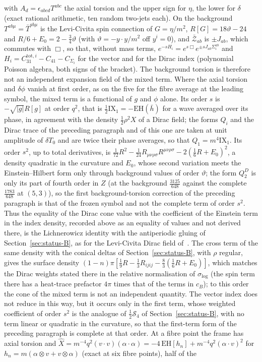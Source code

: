 with \(A_d=\epsilon_{abcd}T^{abc}\) the axial torsion and the upper sign for \(\eta\), the lower for \(\delta\) (exact rational arithmetic, ten random two-jets each). On the background \(T^{ab\mu}=\bar T^{ab\mu}\) is the Levi-Civita spin connection of \(G=\eta/m^2\), \(R[G]=18\vartheta-24\) and \(R/6+E_0=2-\tfrac34\vartheta\) (with \(\vartheta=-y\cdot y/m^2\) off \(y^i=0\)), and \(\bar{\mathcal Z}_{ab}\) is \(\pm J_{ab}\), which commutes with \(\Box\), so that, without mass terms, \(e^{-sH_i}=e^{s\Box}e^{\pm sJ_{ab}\Sigma_i^{ab}}\) and \(H_i=C_{31}^{\mathrm{tot},i}-C_{41}-C_{\Sigma_i}\) for the vector and for the Dirac index (polynomial Poisson algebra, both signs of the bracket). The background torsion is therefore not an independent expansion field of the mixed term. Where the axial torsion and \(\delta\phi\) vanish at first order, as on the five for the fibre average at the leading symbol, the mixed term is a functional of \(g\) and \(\phi\) alone. Its order \(s\) is \(-\sqrt{|g|}R[g]\) at order \(q^2\), that is \(\tfrac12\mathrm{IX}_1=-\mathrm{EH}(\bar h)\) for a wave averaged over its phase, in agreement with the density \(\tfrac12\rho^2X\) of a Dirac field; the forms \(Q_i\) and the Dirac trace of the preceding paragraph and of this one are taken at unit amplitude of \(\delta T_0\) and are twice their phase averages, so that \(Q_1=m^4\mathrm{IX}_1\). Its order \(s^2\), up to total derivatives, is \(\tfrac1{72}R^2-\tfrac1{24}R_{\mu\nu\rho\sigma}R^{\mu\nu\rho\sigma}-2(\tfrac16R+E_0)^2\), a density quadratic in the curvature and \(E_0\), whose second variation meets the Einstein--Hilbert form only through background values of order \(\vartheta\); the form \(Q_2^D\) is only its part of fourth order in \(Z\) (at the background \(\tfrac{3125}{648}\) against the complete \(\tfrac{1783}{648}\) at \((5,3)\)), so the first background-torsion correction of the preceding paragraph is that of the frozen symbol and not the complete term of order \(s^2\). Thus the equality of the Dirac cone value with the coefficient of the Einstein term in the index density, recorded above as an equality of values and not derived there, is the Lichnerowicz identity with the antiperiodic gluing of Section~\ref{sec:status-B}, as for the Levi-Civita Dirac field of~\cite{Kabat1995}. The cross term of the same density with the conical deltas of Section~\ref{sec:status-B}, with \(\rho\) regular, gives the surface density \((1-n)\pi[\tfrac19R-\tfrac13R_{ijij}-\tfrac83(\tfrac16R+E_0)]\), which matches the Dirac weights stated there in the relative normalisation of \(\sigma_{\log}\) (the spin term there has a heat-trace prefactor \(4\pi\) times that of the terms in \(c_B\)); to this order the cone of the mixed term is not an independent quantity. The vector index does not reduce in this way, but it occurs only in the first term, whose weighted coefficient of order \(s^2\) is the analogue of \(\tfrac12\mathcal S_4\) of Section~\ref{sec:status-B}, with no term linear or quadratic in the curvature, so that the first-term form of the preceding paragraph is complete at that order. At a fibre point the frame has axial torsion and \(\hat X=m^{-4}q^2(v\cdot v)(\alpha\cdot\alpha)=-4\,\mathrm{EH}[h_n]+m^{-4}q^2(\alpha\cdot v)^2\) for \(h_n=m(\alpha\otimes v+v\otimes\alpha)\) (exact at six fibre points), half of the 